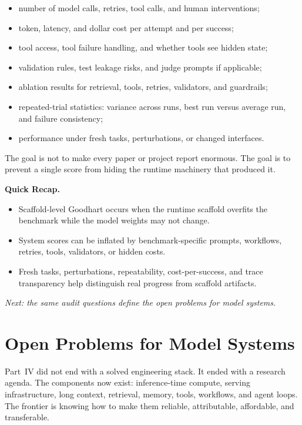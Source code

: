 \begin{itemize}[nosep,leftmargin=1.5em]
  \item number of model calls, retries, tool calls, and human interventions;
  \item token, latency, and dollar cost per attempt and per success;
  \item tool access, tool failure handling, and whether tools see hidden state;
  \item validation rules, test leakage risks, and judge prompts if applicable;
  \item ablation results for retrieval, tools, retries, validators, and guardrails;
  \item repeated-trial statistics: variance across runs, best run versus average run, and failure consistency;
  \item performance under fresh tasks, perturbations, or changed interfaces.
\end{itemize}

The goal is not to make every paper or project report enormous. The goal is to prevent a single score from hiding the runtime machinery that produced it.

\begin{quickrecap}
\textbf{Quick Recap.}
\begin{itemize}[nosep,leftmargin=1.5em]
  \item Scaffold-level Goodhart occurs when the runtime scaffold overfits the benchmark while the model weights may not change.
  \item System scores can be inflated by benchmark-specific prompts, workflows, retries, tools, validators, or hidden costs.
  \item Fresh tasks, perturbations, repeatability, cost-per-success, and trace transparency help distinguish real progress from scaffold artifacts.
\end{itemize}
\textit{Next: the same audit questions define the open problems for model systems.}
\end{quickrecap}


\section{Open Problems for Model Systems}
\label{sec:ch22-open-problems}

Part~IV did not end with a solved engineering stack. It ended with a research agenda. The components now exist: inference-time compute, serving infrastructure, long context, retrieval, memory, tools, workflows, and agent loops. The frontier is knowing how to make them reliable, attributable, affordable, and transferable.

